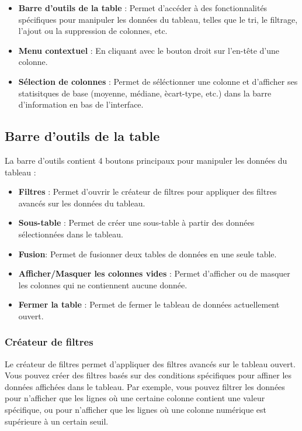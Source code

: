 \documentclass[11pt,a4paper]{article}
\begin{document}
\begin{itemize}
  \item \textbf{Barre d'outils de la table} : Permet d'acc\'eder \`a des fonctionnalit\'es sp\'ecifiques pour manipuler les donn\'ees du tableau, telles que le tri, le filtrage, l'ajout ou la suppression de colonnes, etc.
  \item \textbf{Menu contextuel} : En cliquant avec le bouton droit sur l'en-t\^ete d'une colonne.
  \item \textbf{S\'election de colonnes} : Permet de s\'el\'ectionner une colonne et d'afficher ses statisitques de base (moyenne, m\'ediane, \`ecart-type, etc.) dans la barre d'information en bas de l'interface.
\end{itemize}

\subsection{Barre d'outils de la table}
La barre d'outils contient 4 boutons principaux pour manipuler les donn\'ees du tableau :

\begin{itemize}
  \item \textbf{Filtres} : Permet d'ouvrir le cr\'eateur de filtres pour appliquer des filtres avanc\'es sur les donn\'ees du tableau.
  \item \textbf{Sous-table} : Permet de cr\'eer une sous-table \`a partir des donn\'ees s\'electionn\'ees dans le tableau.
  \item \textbf{Fusion}: Permet de fusionner deux tables de donn\'ees en une seule table.
  \item \textbf{Afficher/Masquer les colonnes vides} : Permet d'afficher ou de masquer les colonnes qui ne contiennent aucune donn\'ee.
  \item \textbf{Fermer la table} : Permet de fermer le tableau de donn\'ees actuellement ouvert.
\end{itemize}

\subsubsection*{Cr\'eateur de filtres}
Le cr\'eateur de filtres permet d'appliquer des filtres avanc\'es sur le tableau ouvert. Vous pouvez cr\'eer des filtres bas\'es sur des conditions sp\'ecifiques pour affiner les donn\'ees affich\'ees dans le tableau. Par exemple, vous pouvez filtrer les donn\'ees pour n'afficher que les lignes o\`u une certaine colonne contient une valeur sp\'ecifique, ou pour n'afficher que les lignes o\`u une colonne num\'erique est sup\'erieure \`a un certain seuil.
\end{document}
